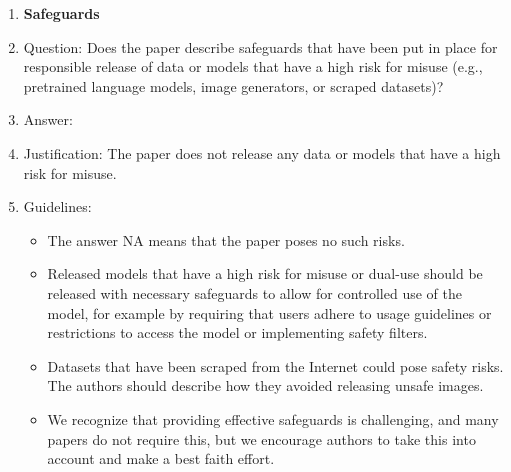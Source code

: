 \documentclass{article}
\begin{document}
\begin{enumerate}
\item {\bf Safeguards}
    \item[] Question: Does the paper describe safeguards that have been put in place for responsible release of data or models that have a high risk for misuse (e.g., pretrained language models, image generators, or scraped datasets)?
    \item[] Answer: \answerNA{} %
    \item[] Justification: The paper does not release any data or models that have a high risk for misuse.
    \item[] Guidelines:
    \begin{itemize}
        \item The answer NA means that the paper poses no such risks.
        \item Released models that have a high risk for misuse or dual-use should be released with necessary safeguards to allow for controlled use of the model, for example by requiring that users adhere to usage guidelines or restrictions to access the model or implementing safety filters. 
        \item Datasets that have been scraped from the Internet could pose safety risks. The authors should describe how they avoided releasing unsafe images.
        \item We recognize that providing effective safeguards is challenging, and many papers do not require this, but we encourage authors to take this into account and make a best faith effort.
    \end{itemize}


\end{enumerate}
\end{document}
